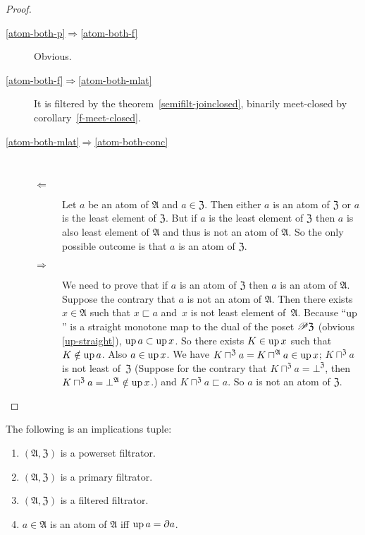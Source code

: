 \begin{proof}
~
\begin{description}
\item [{\ref{atom-both-p}$\Rightarrow$\ref{atom-both-f}}] Obvious.
\item [{\ref{atom-both-f}$\Rightarrow$\ref{atom-both-mlat}}] It is filtered
by the theorem~\ref{semifilt-joinclosed}, binarily meet-closed by
corollary~\ref{f-meet-closed}.
\item [{\ref{atom-both-mlat}$\Rightarrow$\ref{atom-both-conc}}] ~

\begin{description}
\item [{$\Leftarrow$}] Let $a$ be an atom of $\mathfrak{A}$ and $a \in \mathfrak{Z}$. Then either
$a$ is an atom of $\mathfrak{Z}$ or $a$ is the least element of
$\mathfrak{Z}$. But if $a$ is the least element of $\mathfrak{Z}$ then $a$ is
also least element of $\mathfrak{A}$ and thus is not an atom of
$\mathfrak{A}$. So the only possible outcome is that $a$ is an atom of
$\mathfrak{Z}$.
\item [{$\Rightarrow$}]
We need to prove that if $a$ is an atom of $\mathfrak{Z}$
then $a$ is an atom of $\mathfrak{A}$. Suppose the contrary that
$a$ is not an atom of $\mathfrak{A}$. Then there exists $x\in\mathfrak{A}$
such that $x\sqsubset a$ and~$x$ is not least element of~$\mathfrak{A}$. Because ``$\operatorname{up}$'' is a straight
monotone map to the dual of the poset $\mathscr{P}\mathfrak{Z}$ (obvious
\ref{up-straight}), $\operatorname{up} a\subset\operatorname{up} x$. So there exists $K\in\operatorname{up} x$
such that $K\notin\operatorname{up} a$. Also $a\in\operatorname{up} x$. We have $K\sqcap^{\mathfrak{Z}}a=K\sqcap^{\mathfrak{A}}a\in\operatorname{up} x$;
$K\sqcap^{\mathfrak{Z}}a$ is not least of~$\mathfrak{Z}$
(Suppose for the contrary that
$K\sqcap^{\mathfrak{Z}}a=\bot^{\mathfrak{Z}}$, then
$K\sqcap^{\mathfrak{Z}}a=\bot^{\mathfrak{A}}\notin\operatorname{up} x$.) and
$K\sqcap^{\mathfrak{Z}}a\sqsubset a$.
So $a$ is not an atom of $\mathfrak{Z}$.
\end{description}
\end{description}
\end{proof}
\begin{thm}
\label{up-eq-corestar}The following is an implications tuple:
\begin{enumerate}
\item \label{up-eq-corestar-p}$(\mathfrak{A},\mathfrak{Z})$ is a powerset
filtrator.
\item \label{up-eq-corestar-f}$(\mathfrak{A},\mathfrak{Z})$ is a primary filtrator.
\item \label{up-eq-corestar-mlat}$(\mathfrak{A},\mathfrak{Z})$ is a filtered filtrator.
\item \label{up-eq-corestar-conc}$a\in\mathfrak{A}$ is an atom of $\mathfrak{A}$
iff $\operatorname{up} a=\partial a$.
\end{enumerate}
\end{thm}
